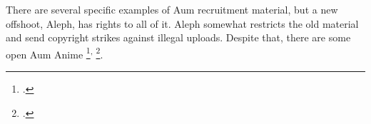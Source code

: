 \documentclass[12pt, letterpaper]{article}
\newcommand{\sorta}[1]{`#1'}
\begin{document}

There are several specific examples of Aum recruitment material, but a new offshoot, Aleph, has rights to all
of it. Aleph somewhat restricts the old material and send copyright strikes against illegal uploads. Despite
that, there are some open Aum Anime \footcite{noauthor_aum_nodate}\textsuperscript{,} \footcite{noauthor_aum_nodate-1}.
\end{document}

